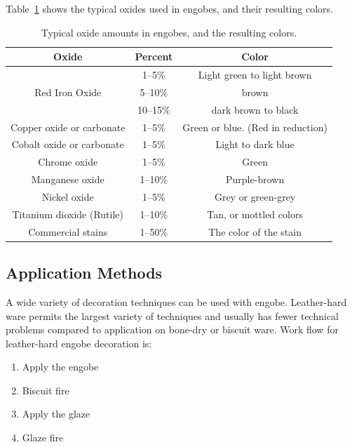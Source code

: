 Table~\ref{tab:engobeoxides} shows the typical oxides used in engobes, and 
their resulting colors.
\begin{center}
  \begin{table}\centering
    \renewcommand{\arraystretch}{1.5}
\begin{tabular}{|c|c|c|}\hline
 \textbf{Oxide}&\textbf{Percent}&\textbf{Color}\\\hline\hline
&1--5\%&Light green to light brown\\\cline{2-3}
Red Iron Oxide&5--10\%&brown\\\cline{2-3}
&10--15\%&dark brown to black\\\hline
Copper oxide or carbonate&1--5\%&Green or blue. (Red in reduction)\\\hline
Cobalt oxide or carbonate&1--5\%&Light to dark blue\\\hline
Chrome oxide&1--5\%&Green\\\hline
Manganese oxide&1--10\%&Purple-brown\\\hline
Nickel oxide&1--5\%&Grey or green-grey\\\hline
Titanium dioxide (Rutile)&1--10\%&Tan, or mottled colors\\\hline
Commercial stains&1--50\%&The color of the stain\\\hline
\end{tabular}
\caption{Typical oxide amounts in engobes, and the resulting colors.}
\label{tab:engobeoxides}
\end{table}
\end{center}
\subsection{Application Methods}
A wide variety of decoration techniques can be used with engobe. Leather-hard 
ware permits the largest variety of techniques and usually has fewer technical 
problems compared to application on bone-dry or biscuit ware. Work flow for 
leather-hard engobe decoration is:
\begin{enumerate}
  \item Apply the engobe
  \item Biscuit fire
  \item Apply the glaze
  \item Glaze fire
\end{enumerate}
